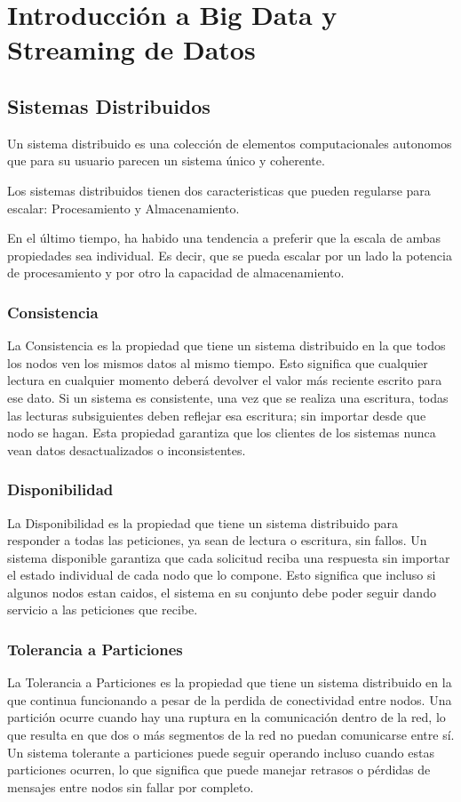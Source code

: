 \section{Introducción a Big Data y Streaming de Datos}

\subsection{Sistemas Distribuidos}
Un sistema distribuido es una colección de elementos computacionales autonomos que para su usuario 
parecen un sistema único y coherente. \parencite{tanenbaum}

Los sistemas distribuidos tienen dos caracteristicas que pueden regularse para escalar: Procesamiento y Almacenamiento.

En el último tiempo, ha habido una tendencia a preferir que la escala de ambas propiedades sea individual. 
Es decir, que se pueda escalar por un lado la potencia de procesamiento y por otro la capacidad de almacenamiento.

\subsubsection{Consistencia}
La Consistencia es la propiedad que tiene un sistema distribuido en la que todos los nodos ven los mismos datos al mismo tiempo.
Esto significa que cualquier lectura en cualquier momento deberá devolver el valor más reciente escrito para ese dato.
Si un sistema es consistente, una vez que se realiza una escritura, todas las lecturas subsiguientes deben reflejar esa escritura;
sin importar desde que nodo se hagan. 
Esta propiedad garantiza que los clientes de los sistemas nunca vean datos desactualizados o inconsistentes.
\subsubsection{Disponibilidad}
La Disponibilidad es la propiedad que tiene un sistema distribuido para responder a todas las peticiones, ya sean de lectura o escritura, sin fallos.
Un sistema disponible garantiza que cada solicitud reciba una respuesta sin importar el estado individual de cada nodo que lo compone.
Esto significa que incluso si algunos nodos estan caidos, el sistema en su conjunto debe poder seguir dando servicio a las peticiones que recibe.
\subsubsection{Tolerancia a Particiones}
La Tolerancia a Particiones es la propiedad que tiene un sistema distribuido en la que continua funcionando a pesar de la perdida de 
conectividad entre nodos. Una partición ocurre cuando hay una ruptura en la comunicación dentro de la red, 
lo que resulta en que dos o más segmentos de la red no puedan comunicarse entre sí.
Un sistema tolerante a particiones puede seguir operando incluso cuando estas particiones ocurren, 
lo que significa que puede manejar retrasos o pérdidas de mensajes entre nodos sin fallar por completo. 


